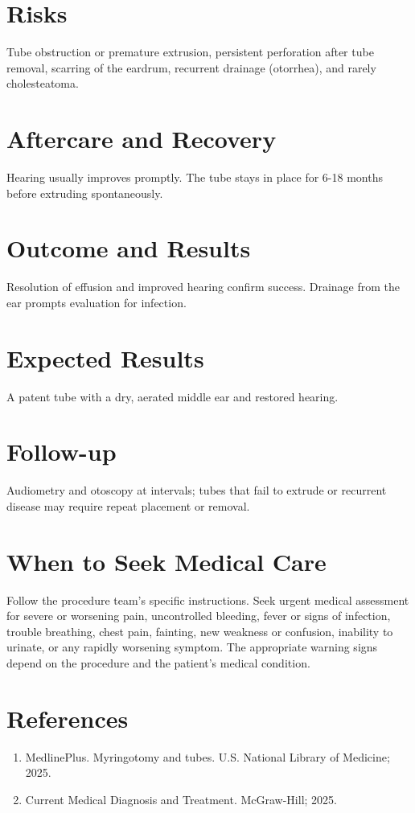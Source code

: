 \section*{Risks}
Tube obstruction or premature extrusion, persistent perforation after tube removal, scarring of the eardrum, recurrent drainage (otorrhea), and rarely cholesteatoma.

\section*{Aftercare and Recovery}
Hearing usually improves promptly. The tube stays in place for 6-18 months before extruding spontaneously.

\section*{Outcome and Results}
Resolution of effusion and improved hearing confirm success. Drainage from the ear prompts evaluation for infection.

\section*{Expected Results}
A patent tube with a dry, aerated middle ear and restored hearing.

\section*{Follow-up}
Audiometry and otoscopy at intervals; tubes that fail to extrude or recurrent disease may require repeat placement or removal.

\section*{When to Seek Medical Care}
Follow the procedure team's specific instructions. Seek urgent medical assessment for severe or worsening pain, uncontrolled bleeding, fever or signs of infection, trouble breathing, chest pain, fainting, new weakness or confusion, inability to urinate, or any rapidly worsening symptom. The appropriate warning signs depend on the procedure and the patient's medical condition.

\section*{References}
\begin{enumerate}
  \item MedlinePlus. Myringotomy and tubes. U.S. National Library of Medicine; 2025.
  \item Current Medical Diagnosis and Treatment. McGraw-Hill; 2025.
\end{enumerate}

\clearpage

